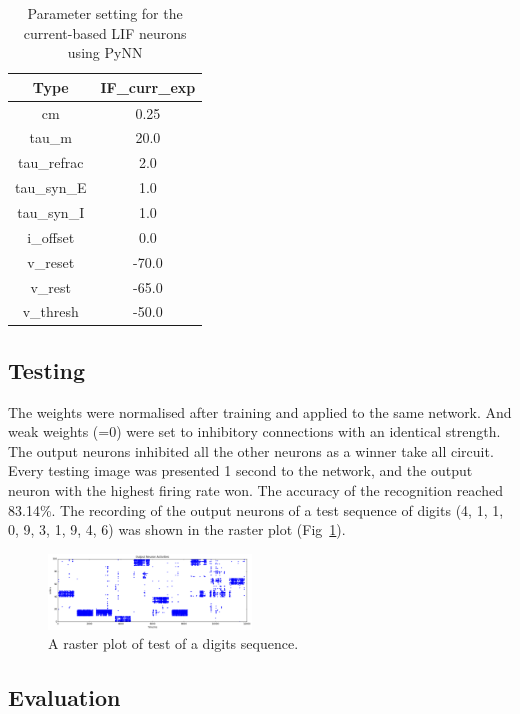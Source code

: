 \begin{table}[hbbp]
\centering
\caption{\label{tbl:pynnSetting}Parameter setting for the current-based LIF neurons using PyNN}
\begin{tabular}{c|c}
\hline
Type & IF\_curr\_exp\\
\hline
cm & 0.25	\\
\hline
tau\_m & 20.0\\
\hline
tau\_refrac & 2.0\\
\hline
tau\_syn\_E & 1.0\\
\hline
tau\_syn\_I & 1.0\\
\hline
i\_offset & 0.0\\
\hline
v\_reset & -70.0\\
\hline
v\_rest & -65.0\\
\hline
v\_thresh & -50.0\\
\hline
\end{tabular}
\end{table}

\subsection{Testing}
The weights were normalised after training and applied to the same network.
And weak weights (=0) were set to inhibitory connections with an identical strength.
The output neurons inhibited all the other neurons as a winner take all circuit.
Every testing image was presented 1 second to the network, and the output neuron with the highest firing rate won.
The accuracy of the recognition reached 83.14\%.
The recording of the output neurons of a test sequence of digits (4, 1, 1, 0, 9, 3, 1, 9, 4, 6) was shown in the raster plot (Fig~\ref{Fig:output}).
\begin{figure}[hbt!]
	\centering
	\includegraphics[width=0.48\textwidth]{images/test300-301.pdf}
	\caption{A raster plot of test of a digits sequence.}
	\label{Fig:output}
\end{figure} 
\subsection{Evaluation}

	